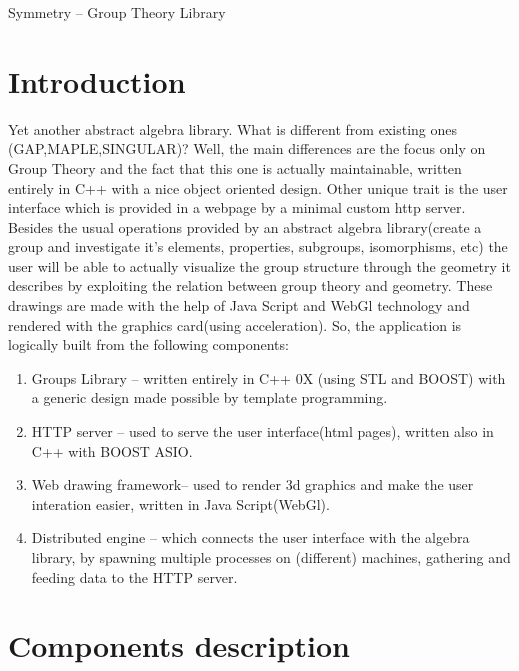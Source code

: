 \documentclass[a4paper,11pt]{article}
\begin{document}
{
\huge
Symmetry -- Group Theory Library
}

\tableofcontents

\section{Introduction}
	Yet another abstract algebra library. What is different from existing ones (GAP,MAPLE,SINGULAR)? Well, the main differences are the focus only on Group Theory and the fact that this one is actually maintainable, written entirely in C++ with a nice object oriented design. Other unique trait is the user interface which is provided in a webpage by a minimal custom http server. Besides the usual operations provided by an abstract algebra library(create a group and investigate it's elements, properties, subgroups, isomorphisms, etc) the user will be able to actually visualize the group structure through the geometry it describes by exploiting the relation between group theory and geometry. These drawings are made with the help of Java Script and WebGl technology and rendered with the graphics card(using acceleration).
	So, the application is logically built from the following components:
\begin{enumerate}
\item
Groups  Library -- written entirely in C++ 0X (using STL and BOOST) with a generic design made possible by template programming.
\item
HTTP server -- used to serve the user interface(html pages), written also in C++ with BOOST ASIO.
\item
Web drawing framework-- used to render 3d graphics and make the user interation easier, written in Java Script(WebGl).
\item
Distributed engine -- which connects the user interface with the algebra library, by spawning multiple processes on (different) machines, gathering and feeding data to the HTTP server.
\end{enumerate}

\section{Components description}
\end{document}
